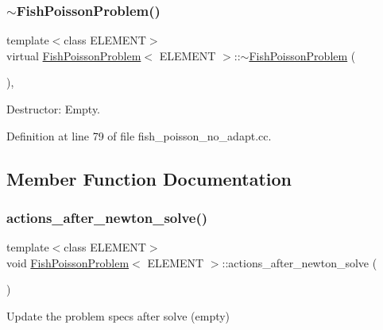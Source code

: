 \subsubsection{\texorpdfstring{$\sim$\+Fish\+Poisson\+Problem()}{~FishPoissonProblem()}}
{\footnotesize\ttfamily template$<$class E\+L\+E\+M\+E\+NT$>$ \\
virtual \hyperlink{classFishPoissonProblem}{Fish\+Poisson\+Problem}$<$ E\+L\+E\+M\+E\+NT $>$\+::$\sim$\hyperlink{classFishPoissonProblem}{Fish\+Poisson\+Problem} (\begin{DoxyParamCaption}{ }\end{DoxyParamCaption})\hspace{0.3cm}{\ttfamily [inline]}, {\ttfamily [virtual]}}



Destructor\+: Empty. 



Definition at line 79 of file fish\+\_\+poisson\+\_\+no\+\_\+adapt.\+cc.



\subsection{Member Function Documentation}
\mbox{\label{classFishPoissonProblem_a76f4ada436ceaa1d0ba96289503d99aa}} 
\subsubsection{\texorpdfstring{actions\+\_\+after\+\_\+newton\+\_\+solve()}{actions\_after\_newton\_solve()}}
{\footnotesize\ttfamily template$<$class E\+L\+E\+M\+E\+NT$>$ \\
void \hyperlink{classFishPoissonProblem}{Fish\+Poisson\+Problem}$<$ E\+L\+E\+M\+E\+NT $>$\+::actions\+\_\+after\+\_\+newton\+\_\+solve (\begin{DoxyParamCaption}{ }\end{DoxyParamCaption})\hspace{0.3cm}{\ttfamily [inline]}}



Update the problem specs after solve (empty) 




